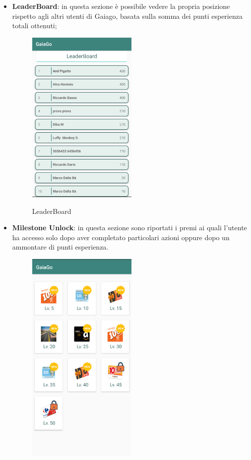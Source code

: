 \begin{itemize}
	\item \textbf{LeaderBoard}: in questa sezione è possibile vedere la propria posizione rispetto agli altri utenti di Gaiago, basata sulla somma dei punti esperienza totali ottenuti;
	\begin{figure}[H] 
		\centering 
		\includegraphics[width=0.5\textwidth]{res/images/Leaderboard.png}\\
		\caption{LeaderBoard}
		\label{leaderboard}
	\end{figure}
\pagebreak
	\item \textbf{Milestone Unlock}: in questa sezione sono riportati i premi ai quali l'utente ha accesso solo dopo aver completato particolari azioni oppure dopo un ammontare di punti esperienza.
	 \begin{figure}[H] 
	 	\centering 
	 	\includegraphics[width=0.5\textwidth]{res/images/milestone1.png}\\

\end{figure}
\end{itemize}
